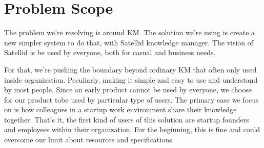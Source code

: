 \section{Problem Scope}
\label{sec:problem-scope}

The problem we're resolving is around \ac{KM}.
The solution we're using is create a new simpler system to do that, with Satellid knowledge manager.
The vision of Satellid is be used by everyone, both for casual and business needs.

For that, we're pushing the boundary beyond ordinary \ac{KM} that often only used inside organization.
Peculiarly, making it simple and easy to use and understand by most people.
Since an early product cannot be used by everyone, we choose for our product tobe used by particular type of users.
The primary case we focus on is how colleagues in a startup work environment share their knowledge together. That's it, the first kind of users of this solution are startup founders and employees within their organization.
For the beginning, this is fine and could overcome our limit about resources and specifications.
